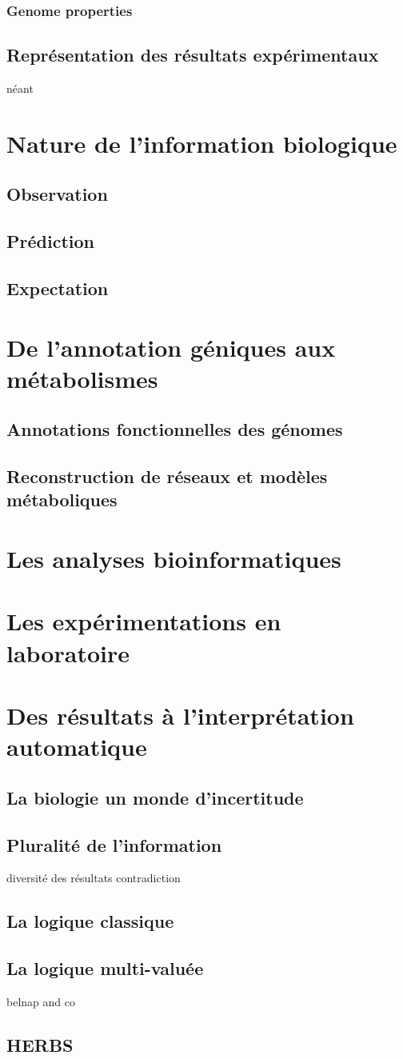 \subsubsection{Genome properties}
\subsection{Représentation des résultats expérimentaux}
néant

\section{Nature de l'information biologique}
\subsection{Observation}
\subsection{Prédiction}
\subsection{Expectation}

\section{De l'annotation géniques aux métabolismes}
\subsection{Annotations fonctionnelles des génomes}
\subsection{Reconstruction de réseaux et modèles métaboliques}
\section{Les analyses bioinformatiques}
\section{Les expérimentations en laboratoire}

\section{Des résultats à l'interprétation automatique}
\subsection{La biologie un monde d'incertitude}
\subsection{Pluralité de l'information}
diversité des résultats contradiction
\subsection{La logique classique}
\subsection{La logique multi-valuée}
belnap and co
\subsection{HERBS}
